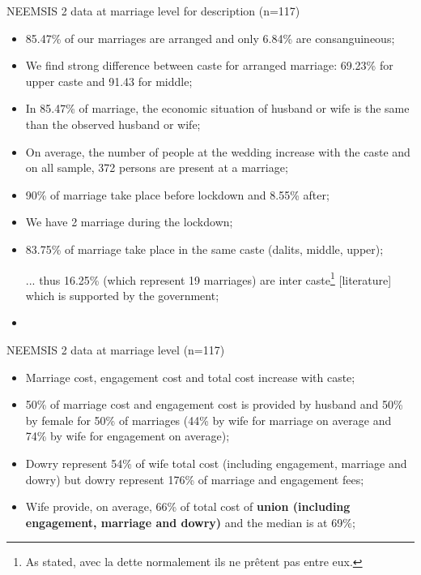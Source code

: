 \documentclass[a4paper, 11pt, onecolumn]{article}
\begin{document}
NEEMSIS 2 data at marriage level for description (n=117)
\begin{itemize}[leftmargin=*]
\item 85.47\% of our marriages are arranged and only 6.84\% are consanguineous;
\item We find strong difference between caste for arranged marriage: 69.23\% for upper caste and 91.43 for middle;
\item In 85.47\% of marriage, the economic situation of husband or wife is the same than the observed husband or wife;
\item On average, the number of people at the wedding increase with the caste and on all sample, 372 persons are present at a marriage;
\item 90\% of marriage take place before lockdown and 8.55\% after;
\item We have 2 marriage during the lockdown;
\item 83.75\% of marriage take place in the same caste (dalits, middle, upper);
\item [...] thus 16.25\% (which represent 19 marriages) are inter caste\footnote{As \cite{Guerin2014a} stated, avec la dette normalement ils ne prêtent pas entre eux.} [literature] which is supported by the government;
\item 
\end{itemize}


NEEMSIS 2 data at marriage level (n=117)
\begin{itemize}[leftmargin=*]
\item Marriage cost, engagement cost and total cost increase with caste;
\item 50\% of marriage cost and engagement cost is provided by husband and 50\% by female for 50\% of marriages (44\% by wife for marriage on average and 74\% by wife for engagement on average);
\item Dowry represent 54\% of wife total cost (including engagement, marriage and dowry) but dowry represent 176\% of marriage and engagement fees;
\item Wife provide, on average, 66\% of total cost of \textbf{union (including engagement, marriage and dowry)} and the median is at 69\%;
\end{itemize}
\end{document}
